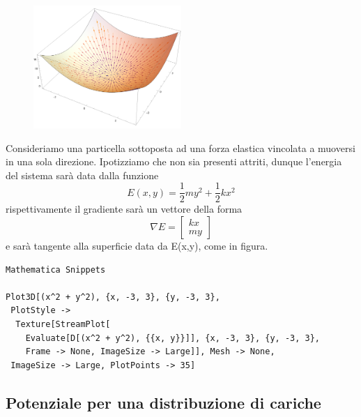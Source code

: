\begin{figure}
  \begin{center}
    \includegraphics[width=0.5\textwidth]{images/harmonic}
  \end{center}
\end{figure}
Consideriamo una particella sottoposta ad una forza elastica vincolata a muoversi in una sola direzione. Ipotizziamo che non sia presenti attriti, dunque l'energia del sistema sar\`a data dalla funzione 
\begin{equation*}
	E(x,y) = \frac{1}{2}my^2 + \frac{1}{2}kx^2
\end{equation*}
rispettivamente il gradiente sar\`a un vettore della forma
\begin{equation*}
	\nabla E = \left [ \begin{array}{c}
		kx \\
		my
	\end{array} \right ]
\end{equation*}
e sar\`a tangente alla superficie data da E(x,y), come in figura.

\begin{lstlisting}
Mathematica Snippets 
	
Plot3D[(x^2 + y^2), {x, -3, 3}, {y, -3, 3}, 
 PlotStyle -> 
  Texture[StreamPlot[
    Evaluate[D[(x^2 + y^2), {{x, y}}]], {x, -3, 3}, {y, -3, 3}, 
    Frame -> None, ImageSize -> Large]], Mesh -> None, 
 ImageSize -> Large, PlotPoints -> 35]
\end{lstlisting}
\subsection{Potenziale per una distribuzione di cariche }

